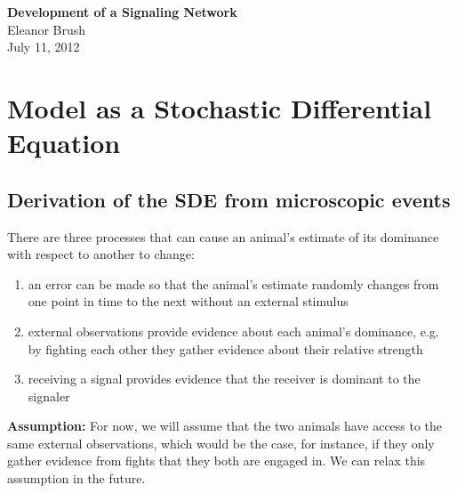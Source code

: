 \documentclass{article}
\begin{document}
\begin{center}
\Large

\end{center}


\vspace{0pt}

\begin{center}
{\bf \LARGE{Development of a Signaling Network}}
\vspace{10pt}
\\ Eleanor Brush
\\ July 11, 2012
\end{center}


\vspace{0pt}
\normalsize
\section{Model as a Stochastic Differential Equation}

\subsection{Derivation of the SDE from microscopic events }
There are three processes that can cause an animal's estimate of its dominance with respect to another to change:
\begin{enumerate}
\item an error can be made so that the animal's estimate randomly changes from one point in time to the next without an external stimulus

\item external observations provide evidence about each animal's dominance, e.g. by fighting each other they gather evidence about their relative strength

\item receiving a signal provides evidence that the receiver is dominant to the signaler

\end{enumerate}
{\bf Assumption:} For now, we will assume that the two animals have access to the same external observations, which would be the case, for instance, if they only gather evidence from fights that they both are engaged in.  We can relax this assumption in the future.
\end{document}
